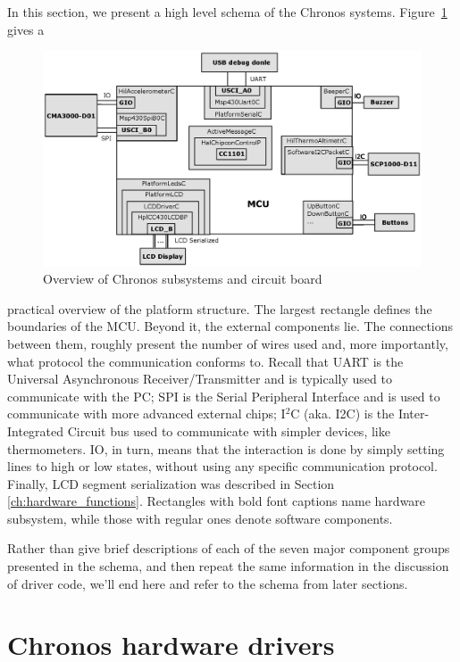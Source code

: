 In this section, we present a high level schema of the Chronos systems. Figure~\ref{fig:chronos_schema} gives a
\begin{figure}[h]
  \centering
  \includegraphics[width=1.05\textwidth]{diagrams/chronos_schema.eps}
  \caption{Overview of Chronos subsystems and circuit board}
  \label{fig:chronos_schema}
\end{figure}
practical overview of the platform structure. The largest rectangle defines the boundaries of the MCU. Beyond it, the external components lie. The connections between them, roughly present the number of wires used and, more importantly, what protocol the communication conforms to. Recall that UART is the Universal Asynchronous Receiver/Transmitter and is typically used to communicate with the PC; SPI is the Serial Peripheral Interface and is used to communicate with more advanced external chips; I$^2$C (aka. I2C) is the Inter-Integrated Circuit bus used to communicate with simpler devices, like thermometers. IO, in turn, means that the interaction is done by simply setting lines to high or low states, without using any specific communication protocol. Finally, LCD segment serialization was described in Section \ref{ch:hardware_functions}. Rectangles with bold font captions name hardware subsystem, while those with regular ones denote software components.

Rather than give brief descriptions of each of the seven major component groups presented in the schema, and then repeat the same information in the discussion of driver code, we'll end here and refer to the schema from later sections.

\section{Chronos hardware drivers}

